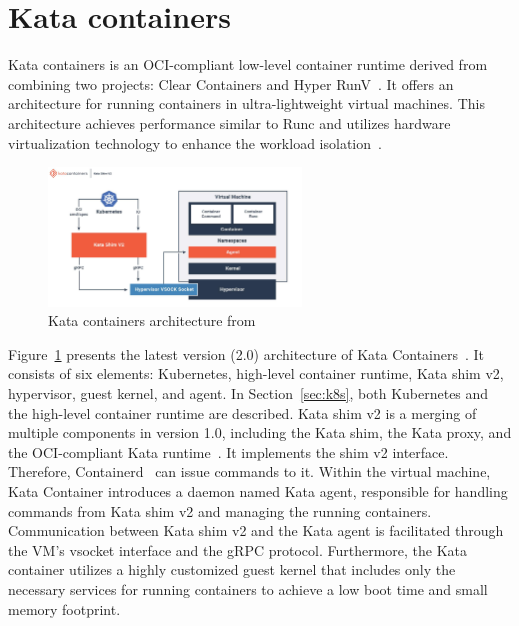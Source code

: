 \section{Kata containers}

Kata containers is an OCI-compliant low-level container runtime derived from combining two projects: Clear Containers and Hyper RunV~\cite*{Kata-Containers}. It offers an architecture for running containers in ultra-lightweight virtual machines. This architecture achieves performance similar to Runc and 
utilizes hardware virtualization technology to enhance the workload isolation~\cite*{9198653}.
\begin{figure}[htp]
  \centering
  \includegraphics[width=0.6\textwidth]{images/kata.PNG}
  \caption[Kata containers architecture]{Kata containers architecture from~\cite*{Kata-Containers} }
  \label{fig:kata}
\end{figure}
Figure~\ref{fig:kata} presents the latest version (2.0) architecture of Kata Containers~\cite*{Kata_arch}. It consists of six elements: Kubernetes, high-level container runtime, Kata shim v2, hypervisor, guest kernel, and agent. In Section~\ref{sec:k8s}, both Kubernetes and the high-level container 
runtime are described. Kata shim v2 is a merging of multiple components in version 1.0, including the Kata shim, the Kata proxy, and the OCI-compliant Kata runtime~\cite*{Kata_arch}. It implements the shim v2 interface. Therefore, Containerd~\cite*{containerd} can issue commands to it. Within the 
virtual machine, Kata Container introduces a daemon named Kata agent, responsible for handling commands from Kata shim v2 and managing the running containers. Communication between Kata shim v2 and the Kata agent is facilitated through the VM's vsocket interface and the gRPC protocol. Furthermore, the 
Kata container utilizes a highly customized guest kernel that includes only the necessary services for running containers to achieve a low boot time and small memory footprint.


